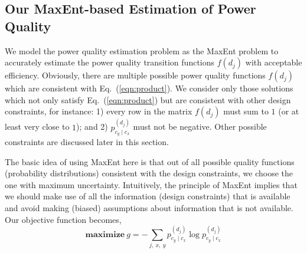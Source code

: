 \vspace{0.5cm}
\subsection{Our MaxEnt-based Estimation of Power Quality} We model the power quality estimation problem as the MaxEnt problem to accurately estimate the power quality transition functions $f(d_j)$ with acceptable efficiency. Obviously, there are multiple possible power quality functions $f(d_j)$ which are consistent with Eq.~(\ref{eqn:product}). We consider only those solutions which not only satisfy Eq.~(\ref{eqn:product}) but are consistent with other design constraints, for instance: 1) every row in the matrix $f(d_j)$ must sum to $1$ (or at least very close to $1$); and 2) $p_{c_y \mid c_x}^{(d_j)}$ must not be negative. Other possible constraints are discussed later in this section.

The basic idea of using MaxEnt here is that out of all possible quality functions (probability distributions) consistent with the design constraints, we choose the one with maximum uncertainty. Intuitively, the principle of MaxEnt implies that we should make use of all the information (design constraints) that is available and avoid making (biased) assumptions about information that is not available. Our objective function becomes,
\begin{equation} \label{objective}
\mathrm{\mathbf{maximize}}~g = -\sum_{j, ~x, ~y} p_{c_y \mid c_x}^{(d_j)} \log p_{c_y \mid c_x}^{(d_j)}
\end{equation}

